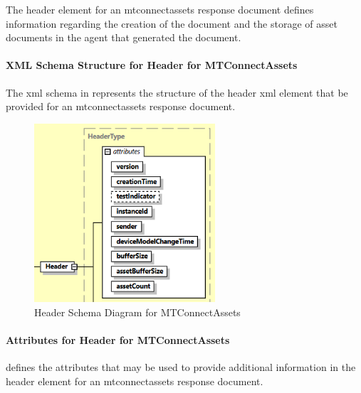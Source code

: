 \documentclass{mtconnect}	%
\begin{document}
The \gls{header} element for an \gls{mtconnectassets response document} defines information regarding the creation of the document and the storage of \glspl{asset document} in the \gls{agent} that generated the document.  

\paragraph{XML Schema Structure for Header for MTConnectAssets}\mbox{}

The \gls{xml schema} in  represents the structure of the \gls{header} \gls{xml} element that \MUST be provided for an \gls{mtconnectassets response document}.  

\begin{figure}[ht]
  \centering
  \includegraphics[width=0.6\textwidth]{figures/header-schema-diagram-for-mtconnectassets.png}
  \caption{Header Schema Diagram for MTConnectAssets}
  \label{fig:header-schema-diagram-for-mtconnectassets}
\end{figure}

\FloatBarrier

\paragraph{Attributes for Header for MTConnectAssets}\mbox{}

 defines the attributes that may be used to provide additional information in the \gls{header} element for an \gls{mtconnectassets response document}.
\end{document}
